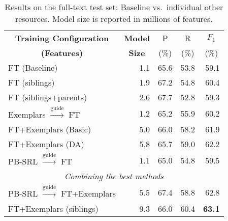 
\setlength\tabcolsep{4pt}

\begin{table}\centering\small
\def\arraystretch{1}
\begin{tabular}{lr<{\hspace*{5pt}}rrr}%
\toprule
\multicolumn{1}{c}{\textbf{Training Configuration}} 
& \multicolumn{1}{c}{\textbf{Model}} &  \multicolumn{1}{c}{P} &
\multicolumn{1}{c}{R} 
&  \multicolumn{1}{c}{$F_1$} \\
 \multicolumn{1}{c}{\textbf{(Features)}} 
& \multicolumn{1}{c}{\textbf{Size}} 
&  \multicolumn{1}{c}{(\%)} &  \multicolumn{1}{c}{(\%)} &  \multicolumn{1}{c}{(\%)}\\
\midrule
FT (Baseline) & 1.1 & 65.6 & 53.8 & 59.1 \\ %
\midrule
FT (siblings) & 1.9 & 67.2 & 54.8 & 60.4 \\
FT (siblings+parents) & 2.6 & 67.7 & 52.8 & 59.3 \\
\midrule
Exemplars $\xrightarrow{\text{guide}}$ FT & 1.2 & 65.2 & 55.9 & 60.2 \\
FT+Exemplars (Basic) & 5.0 & 66.0 & 58.2 & 61.9 \\
FT+Exemplars (DA) & 5.8 & 65.7 & 59.0 & 62.2 \\
\midrule
PB-SRL $\xrightarrow{\text{guide}}$ FT & 1.1 & 65.0 & 54.8 & 59.5 \\
\midrule
\multicolumn{5}{c}{\em{Combining the best methods}}\\
\midrule
PB-SRL $\xrightarrow{\text{guide}}$ FT+Exemplars & 5.5 & 67.4 & 58.8 & 62.8 \\
FT+Exemplars (siblings) & 9.3 & 66.0 & 60.4 & \textbf{63.1} \\
\bottomrule
\end{tabular}
\caption{Results on the full-text test set:
Baseline vs.~individual other resources.  Model size is reported in
millions of features.
\label{tbl:results}}
\end{table}

